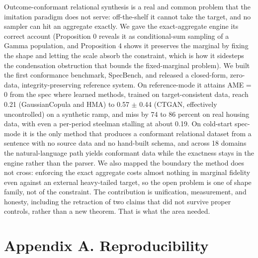 Outcome-conformant relational synthesis is a real and common problem
that the imitation paradigm does not serve: off-the-shelf it cannot take
the target, and no sampler can hit an aggregate exactly. We gave the
exact-aggregate engine its correct account (Proposition 0 reveals it as
conditional-sum sampling of a Gamma population, and Proposition 4 shows
it preserves the marginal by fixing the shape and letting the scale
absorb the constraint, which is how it sidesteps the condensation
obstruction that bounds the fixed-marginal problem). We built the first
conformance benchmark, SpecBench, and released a closed-form, zero-data,
integrity-preserving reference system. On reference-mode it attains AME
= 0 from the spec where learned methods, trained on target-consistent
data, reach 0.21 (GaussianCopula and HMA) to 0.57 \ensuremath{\pm} 0.44
(CTGAN, effectively uncontrolled) on a synthetic ramp, and miss by 74 to
86 percent on real housing data, with even a per-period steelman
stalling at about 0.19. On cold-start spec-mode it is the only method
that produces a conformant relational dataset from a sentence with no
source data and no hand-built schema, and across 18 domains the
natural-language path yields conformant data while the exactness stays
in the engine rather than the parser. We also mapped the boundary the
method does not cross: enforcing the exact aggregate costs almost
nothing in marginal fidelity even against an external heavy-tailed
target, so the open problem is one of shape family, not of the
constraint. The contribution is unification, measurement, and honesty,
including the retraction of two claims that did not survive proper
controls, rather than a new theorem. That is what the area needed.

\hypertarget{appendix-a.-reproducibility}{%
\section{Appendix A.
Reproducibility}\label{appendix-a.-reproducibility}}

